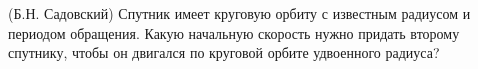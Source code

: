 (Б.Н. Садовский)
Спутник имеет круговую орбиту с известным радиусом и периодом обращения.
Какую начальную скорость нужно придать второму спутнику, чтобы он
двигался по круговой орбите удвоенного радиуса?
